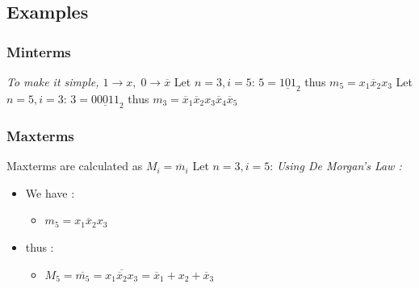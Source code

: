 \documentclass[12pt,openany, tikz,border=10pt]{book}
\begin{document}
\subsection{Examples}
\subsubsection*{Minterms}
\textit{To make it simple, $1 \rightarrow x, \; 0 \rightarrow \overline{x} $} \newline
Let $ n = 3, i = 5$:\newline
$ 5 = \underline{101}_2$
thus $m_5 = x_1 \overline{x}_2 x_3$ \newline
\vspace*{10px}
Let $n=5, i=3$:\newline
$ 3 = \underline{00011}_2$
thus $m_3 = \overline{x}_1 \overline{x}_2 x_3 \overline{x}_4 \overline{x}_5$ \newline

\newpage
\subsubsection{Maxterms}
Maxterms are calculated as $M_i = \overline{m}_i$ \newline
Let $ n = 3, i = 5$:
\newline \textit{Using De Morgan's Law :}
\begin{itemize}
    \item[]We have :
    \begin{itemize}
        \item[] $m_5 = x_1 \overline{x}_2 x_3$
    \end{itemize}
    \item[]thus :
    \begin{itemize}
        \item[] $M_5 = \overline{m_5} =  \overline{x_1 \overline{x}_2 x_3} = \overline{x}_1 + x_2 + \overline{x}_3$ \newline
    \end{itemize}
\end{itemize}
\end{document}
